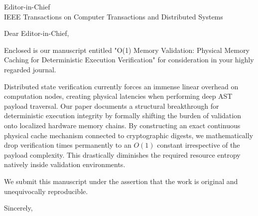 \documentclass[11pt]{letter}
\begin{document}
\begin{letter}{Editor-in-Chief \\ IEEE Transactions on Computer Transactions and Distributed Systems}
\opening{Dear Editor-in-Chief,}

Enclosed is our manuscript entitled "O(1) Memory Validation: Physical Memory Caching for Deterministic Execution Verification" for consideration in your highly regarded journal.

Distributed state verification currently forces an immense linear overhead on computation nodes, creating physical latencies when performing deep AST payload traversal. Our paper documents a structural breakthrough for deterministic execution integrity by formally shifting the burden of validation onto localized hardware memory chains. By constructing an exact continuous physical cache mechanism connected to cryptographic digests, we mathematically drop verification times permanently to an $O(1)$ constant irrespective of the payload complexity. This drastically diminishes the required resource entropy natively inside validation environments. 

We submit this manuscript under the assertion that the work is original and unequivocally reproducible.

\closing{Sincerely,}
\end{letter}
\end{document}
